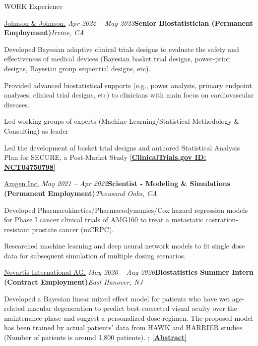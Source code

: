 \documentclass[
	11pt, %
]{resume} %
\begin{document}
\begin{rSection}{WORK Experience}
\newpage
\begin{rSubsection}{
\href{https://www.jnjmedtech.com/en-US}{Johnson \& Johnson.}
}{\em Apr 2022 -- May 2023}{\textbf{Senior Biostatistician (Permanent Employment)}}{\em Irvine, CA}
\item Developed Bayesian adaptive clinical trials designs to evaluate the safety and effectiveness of medical devices (Bayesian basket trial designs, power-prior designs, Bayesian group sequential designs, etc).
\item Provided advanced biostatistical supports (e.g., power analysis, primary endpoint analyses, clinical trial designs, etc) to clinicians with main focus on cardiovascular diseases.
\item Led working groups of experts (Machine Learning/Statistical Methodology \& Consulting) as leader
\item Led the development of basket trial designs and authored Statistical Analysis Plan for SECURE, a Post-Market Study [\href{https://clinicaltrials.gov/ct2/show/NCT04750798}{\underline{\textbf{ClinicalTrials.gov ID: NCT04750798}}}]
\end{rSubsection}


\begin{rSubsection}{
\href{https://www.amgen.com/}{Amgen Inc.}
}{\em May 2021 -- Apr 2022}{\textbf{Scientist - Modeling \& Simulations (Permanent Employment)}}{\em Thousand Oaks, CA}
\item 
Developed Pharmacokinetics/Pharmacodynamics/Cox hazard regression models for Phase I cancer clinical trials of AMG160 to treat a metastatic castration-resistant prostate cancer (mCRPC).
\item 
Researched machine learning and deep neural network models to fit single dose data for subsequent simulation of multiple dosing scenarios. 
\end{rSubsection}

\begin{rSubsection}{
\href{https://www.pharma.us.novartis.com/}{Novartis International AG.}
}{\em May 2020 -- Aug 2020}{\textbf{Biostatistics Summer Intern (Contract Employment)}}{\em East Hanover, NJ}
\item 
Developed a Bayesian linear mixed effect model for patients who have wet age-related macular degeneration to predict best-corrected visual acuity over the maintenance phase and suggest a personalized dose regimen. The proposed model has been trained by actual patients' data from HAWK and HARRIER studies (Number of patients is around 1,800 patients). ; \href{https://sites.google.com/view/seyoonlee/home/projects/novartis-summer-internship-project?authuser=0#h.dfc3zhswkx8m}
{\underline{\textbf{[Abstract]}}}
\end{rSubsection}


\end{rSection}
\end{document}
